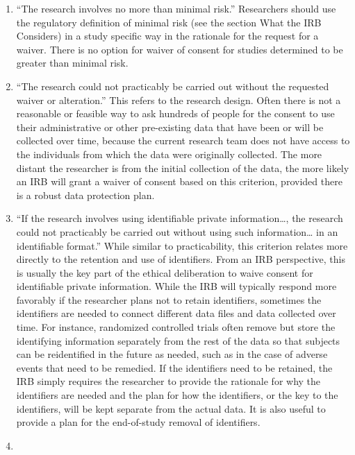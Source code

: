 \begin{enumerate}
\def\labelenumi{\roman{enumi}.}
\item
  ``The research involves no more than minimal risk.'' Researchers should use the regulatory definition of minimal risk (see the section What the IRB Considers) in a study specific way in the rationale for the request for a waiver. There is no option for waiver of consent for studies determined to be greater than minimal risk.
\item
  ``The research could not practicably be carried out without the requested waiver or alteration.'' This refers to the research design. Often there is not a reasonable or feasible way to ask hundreds of people for the consent to use their administrative or other pre-existing data that have been or will be collected over time, because the current research team does not have access to the individuals from which the data were originally collected. The more distant the researcher is from the initial collection of the data, the more likely an IRB will grant a waiver of consent based on this criterion, provided there is a robust data protection plan.
\item
  ``If the research involves using identifiable private information\ldots{}, the research could not practicably be carried out without using such information\ldots{} in an identifiable format.'' While similar to practicability, this criterion relates more directly to the retention and use of identifiers. From an IRB perspective, this is usually the key part of the ethical deliberation to waive consent for identifiable private information. While the IRB will typically respond more favorably if the researcher plans not to retain identifiers, sometimes the identifiers are needed to connect different data files and data collected over time. For instance, randomized controlled trials often remove but store the identifying information separately from the rest of the data so that subjects can be reidentified in the future as needed, such as in the case of adverse events that need to be remedied. If the identifiers need to be retained, the IRB simply requires the researcher to provide the rationale for why the identifiers are needed and the plan for how the identifiers, or the key to the identifiers, will be kept separate from the actual data. It is also useful to provide a plan for the end-of-study removal of identifiers.
\item

\end{enumerate}
